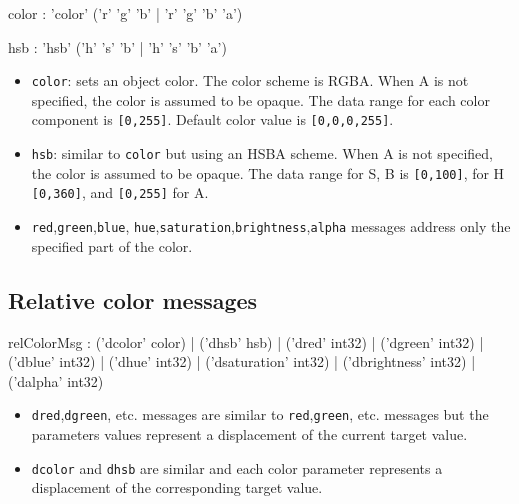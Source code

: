 \documentclass[a4paper,twoside]{report}
\newcommand{\subsublevel}[1]	{\subsection{#1}}
\newcommand{\OSC}[1]		{\texttt{#1}}
\newcommand{\values}[1]	{\texttt{#1}}
\begin{document}
\begin{rail}
color :		'color' ('r' 'g' 'b' | 'r' 'g' 'b' 'a') 
\end{rail}
\begin{rail}
hsb :		'hsb' ('h' 's' 'b' | 'h' 's' 'b' 'a') 
\end{rail}

\begin{itemize}
\item \OSC{color}: sets an object color. The color scheme is RGBA. When A is not specified, the color is assumed to be opaque. The data range for each color component is \values{[0,255]}. Default color value is \values{[0,0,0,255]}.
\item \OSC{hsb}: similar to \OSC{color} but using an HSBA scheme. When A is not specified, the color is assumed to be opaque. The data range for S, B is \values{[0,100]}, for H \values{[0,360]}, and \values{[0,255]} for A.
\item \OSC{red},\OSC{green},\OSC{blue}, \OSC{hue},\OSC{saturation},\OSC{brightness},\OSC{alpha} messages address only the specified part of the color.
\end{itemize}

\subsublevel{Relative color messages}
\label{relcolormsg}

\begin{rail}
relColorMsg :  
		 	('dcolor' color) 
		| 	('dhsb' hsb) 
		| 	('dred' int32) 
		| 	('dgreen' int32) 
		| 	('dblue' int32) 
		| 	('dhue' int32) 
		| 	('dsaturation' int32) 
		| 	('dbrightness' int32) 
		| 	('dalpha' int32) 
\end{rail}

\begin{itemize}
\item \OSC{dred},\OSC{dgreen}, etc. messages are similar to \OSC{red},\OSC{green}, etc. messages but the parameters values represent a displacement of the current target value.
\item \OSC{dcolor} and \OSC{dhsb} are similar and each color parameter represents a displacement of the corresponding target value.
\end{itemize}
\end{document}

